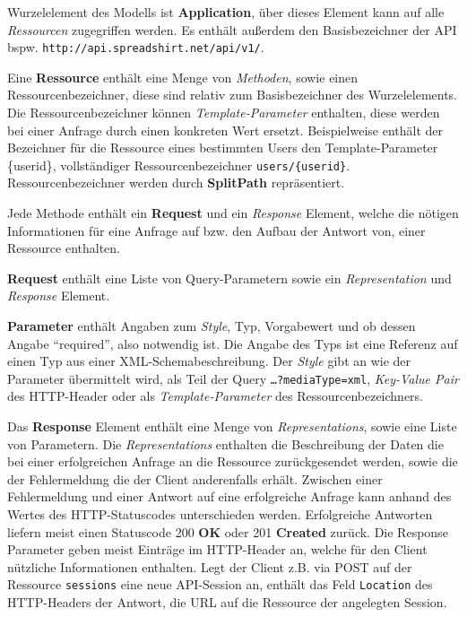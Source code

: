 Wurzelelement des Modells ist \textbf{Application}, über dieses Element kann auf alle \emph{Ressourcen} zugegriffen werden. Es enthält außerdem den Basisbezeichner der API bspw. \texttt{http://api.spreadshirt.net/api/v1/}. 

Eine \textbf{Ressource} enthält eine Menge von \emph{Methoden}, sowie einen Ressourcenbezeichner, diese sind relativ zum Basisbezeichner des Wurzelelements. Die Ressourcenbezeichner können \emph{Template-Parameter} enthalten, diese werden bei einer Anfrage durch einen konkreten Wert ersetzt. Beispielweise enthält der Bezeichner für die Ressource eines bestimmten Users den Template-Parameter \{userid\}, vollständiger Ressourcenbezeichner \texttt{users/\{userid\}}. Ressourcenbezeichner werden durch \textbf{SplitPath} repräsentiert. 

Jede Methode enthält ein \textbf{Request} und ein \emph{Response} Element, welche die nötigen Informationen für eine Anfrage auf bzw. den Aufbau der Antwort von, einer Ressource enthalten.

\textbf{Request} enthält eine Liste von Query-Parametern sowie ein \emph{Representation} und \emph{Response} Element.

\textbf{Parameter} enthält Angaben zum \emph{Style}, Typ, Vorgabewert und ob dessen Angabe \enquote{required}, also notwendig ist. Die Angabe des Typs ist eine Referenz auf einen Typ aus einer XML-Schemabeschreibung. Der \emph{Style} gibt an wie der Parameter übermittelt wird, als Teil der Query \texttt{\ldots{}?mediaType=xml}, \emph{Key-Value Pair} des HTTP-Header oder als \emph{Template-Parameter} des Ressourcenbezeichners. 

Das \textbf{Response} Element enthält eine Menge von \emph{Representations}, sowie eine Liste von Parametern. Die \emph{Representations} enthalten die Beschreibung der Daten die bei einer erfolgreichen Anfrage an die Ressource zurückgesendet werden, sowie die der Fehlermeldung die der Client anderenfalls erhält. Zwischen einer Fehlermeldung und einer Antwort auf eine erfolgreiche Anfrage kann anhand des Wertes des HTTP-Statuscodes unterschieden werden. Erfolgreiche Antworten liefern meist einen Statuscode 200 \textbf{OK} oder 201 \textbf{Created} zurück. Die Response Parameter geben meist Einträge im HTTP-Header an, welche für den Client nützliche Informationen enthalten. Legt der Client z.B. via POST auf der Ressource \texttt{sessions} eine neue API-Session an, enthält das Feld \texttt{Location} des HTTP-Headers der Antwort, die URL auf die Ressource der angelegten Session.

